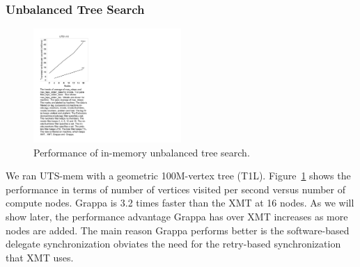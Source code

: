 \subsubsection{Unbalanced Tree Search}
\begin{figure}[ht]
    \begin{center}
      \includegraphics[width=0.5\textwidth]{figs/uts_performance.pdf}
    \end{center}
    \caption{Performance of in-memory unbalanced tree search.}
    \label{fig:uts_compare}
\end{figure}

We ran UTS-mem with a geometric 100M-vertex tree
(T1L). Figure~\ref{fig:uts_compare} shows the performance in terms of
number of vertices visited per second versus number of compute
nodes. Grappa is 3.2 times faster than the XMT at 16 nodes.  As we will show later, the performance advantage Grappa has over XMT increases as more nodes are added.  The main reason Grappa performs better is the software-based delegate synchronization obviates the need for the retry-based synchronization that XMT uses.

